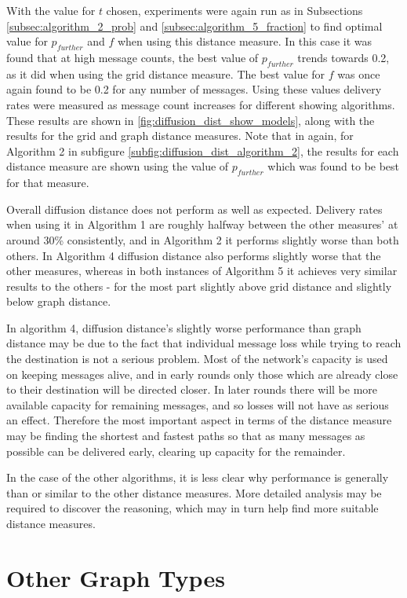 \documentclass[bsc,frontabs,twoside,singlespacing,parskip,deptreport]{infthesis}     %
\begin{document}
With the value for $t$ chosen, experiments were again run as in Subsections \ref{subsec:algorithm_2_prob} and \ref{subsec:algorithm_5_fraction} to find optimal value for $p_{further}$ and $f$ when using this distance measure. In this case it was found that at high message counts, the best value of $p_{further}$ trends towards 0.2, as it did when using the grid distance measure. The best value for $f$ was once again found to be 0.2 for any number of messages. Using these values delivery rates were measured as message count increases for different showing algorithms. These results are shown in \ref{fig:diffusion_dist_show_models}, along with the results for the grid and graph distance measures. Note that in again, for Algorithm 2 in subfigure \ref{subfig:diffusion_dist_algorithm_2}, the results for each distance measure are shown using the value of $p_{further}$ which was found to be best for that measure.

Overall diffusion distance does not perform as well as expected. Delivery rates when using it in Algorithm 1 are roughly halfway between the other measures' at around 30\% consistently, and in Algorithm 2 it performs slightly worse than both others. In Algorithm 4 diffusion distance also performs slightly worse that the other measures, whereas in both instances of Algorithm 5 it achieves very similar results to the others - for the most part slightly above grid distance and slightly below graph distance.

In algorithm 4, diffusion distance's slightly worse performance than graph distance may be due to the fact that individual message loss while trying to reach the destination is not a serious problem. Most of the network's capacity is used on keeping messages alive, and in early rounds only those which are already close to their destination will be directed closer. In later rounds there will be more available capacity for remaining messages, and so losses will not have as serious an effect. Therefore the most important aspect in terms of the distance measure may be finding the shortest and fastest paths so that as many messages as possible can be delivered early, clearing up capacity for the remainder.

In the case of the other algorithms, it is less clear why performance is generally than or similar to the other distance measures. More detailed analysis may be required to discover the reasoning, which may in turn help find more suitable distance measures.

\section{Other Graph Types}
\end{document}
